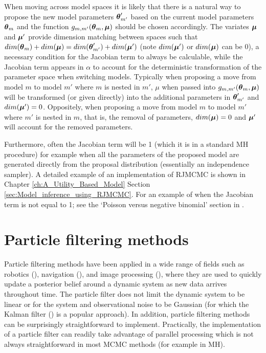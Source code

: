 When moving across model spaces it is likely that there is a natural way to propose the new model parameters
\(\boldsymbol{\theta}'_{m'}\) based on the current model parameters \(\boldsymbol{\theta}_m\) and the function \(g_{m, m'}(\boldsymbol{\theta}_m,
\boldsymbol{\mu})\) should be chosen accordingly. The variates \(\boldsymbol{\mu}\) and \(\boldsymbol{\mu}'\) provide dimension matching between
spaces such that \(dim(\boldsymbol{\theta}_m) + dim(\boldsymbol{\mu}) = dim(\boldsymbol{\theta}'_{m'}) + dim(\boldsymbol{\mu}')\) (note \(dim(\boldsymbol{\mu}')\) or
\(dim(\boldsymbol{\mu})\) can be 0), a necessary condition for the Jacobian term to always be calculable, while the Jacobian term
appears in \(\alpha\) to account for the deterministic transformation of the parameter space when switching models.
Typically when proposing a move from model \(m\) to model \(m'\) where \(m\) is nested in \(m'\), \(\mu\) when passed
into \(g_{m, m'}(\boldsymbol{\theta}_m, \boldsymbol{\mu})\) will be transformed (or given directly) into the additional parameters in
\(\boldsymbol{\theta}'_{m'}\) and \(dim(\boldsymbol{\mu}') = 0\). Oppositely, when proposing a move from model \(m\) to model \(m'\) where
\(m'\) is nested in \(m\), that is, the removal of parameters, \(dim(\boldsymbol{\mu}) = 0\) and \(\boldsymbol{\mu}'\) will account for
the removed parameters.

Furthermore, often the Jacobian term will be 1 (which it is in a standard \gls{MH} procedure) for example when all the
parameters of the proposed model are generated directly from the proposal distribution (essentially an independence
sampler). A detailed example of an implementation of \gls{RJMCMC} is shown in Chapter \ref{ch:A_Utility_Based_Model}
Section \ref{sec:Model_inference_using_RJMCMC}. For an example of when the Jacobian term is not equal to 1; see the
`Poisson versus negative binomial' section in \cite{hastie2012}.

\section{Particle filtering methods}
\label{sec:Particle_filtering_methods_intro}

Particle filtering methods have been applied in a wide range of fields such as robotics (\cite{montemerlo2002,
rekleitis2004}), navigation (\cite{gustafsson2002}), and image processing (\cite{nummiaro2003}), where they are used to
quickly update a posterior belief around a dynamic system as new data arrives throughout time. The particle filter does
not limit the dynamic system to be linear or for the system and observational noise to be Gaussian (for which the Kalman
filter (\cite{kalman1960}) is a popular approach). In addition, particle filtering methods can be surprisingly
straightforward to implement. Practically, the implementation of a particle filter can readily take advantage of
parallel processing which is not always straightforward in most \gls{MCMC} methods (for example in \gls{MH}).

